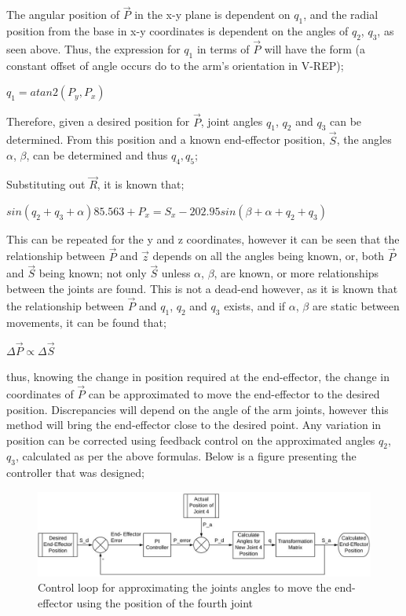 \documentclass[12pt,openany,a4paper]{book}
\begin{document}
The angular position of $\vec{P}$ in the x-y plane is dependent on $q_1$, and the radial position from the base in x-y coordinates is dependent on the angles of $q_2$, $q_3$, as seen above. Thus, the expression for $q_1$ in terms of $\vec{P}$ will have the form (a constant offset of angle occurs do to the arm's orientation in V-REP);

$q_1 = atan2( P_y, P_x)$

Therefore, given a desired position for $\vec{P}$, joint angles $q_1$, $q_2$ and $q_3$ can be determined. From this position and a known end-effector position, $\vec{S}$, the angles $\alpha$, $\beta$, can be determined and thus $q_4, q_5$;

Substituting out $\vec{R}$, it is known that;

$sin(q_2 + q_3 + \alpha) 85.563 + P_x = S_x -202.95 sin(\beta + \alpha + q_2 + q_3) $

This can be repeated for the y and z coordinates, however it can be seen that the relationship between $\vec{P}$ and $\vec{z}$ depends on all the angles being known, or, both $\vec{P}$ and $\vec{S}$ being known; not only $\vec{S}$ unless $\alpha$, $\beta$, are known, or more relationships between the joints are found. This is not a dead-end however, as it is known that the relationship between $\vec{P}$ and $q_1$, $q_2$ and $q_3$ exists, and if $\alpha$, $\beta$ are static between movements, it can be found that;

$\Delta \vec{P} \propto \Delta \vec{S}$

thus, knowing the change in position required at the end-effector, the change in coordinates of $\vec{P}$ can be approximated to move the end-effector to the desired position. Discrepancies will depend on the angle of the arm joints, however this method will bring the end-effector close to the desired point. Any variation in position can be corrected using feedback control on the approximated angles $q_2$, $q_3$, calculated as per the above formulas. Below is a figure presenting the controller that was designed;


\begin{center}
\begin{figure}[htb]
  \includegraphics[width=1.14\linewidth]{inv_kinematics_and_control.jpg}
\caption{Control loop for approximating the joints angles to move the end-effector using the position of the fourth joint}
\end{figure}
\end{center}
\end{document}

